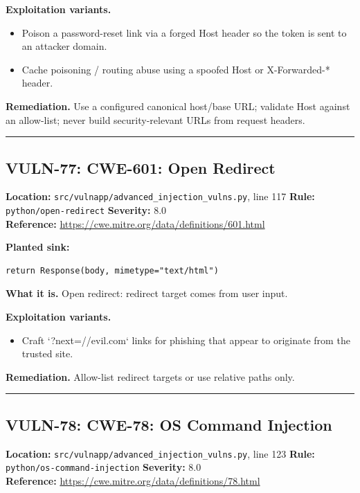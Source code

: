 \documentclass[11pt,a4paper]{article}
\begin{document}
\noindent\textbf{Exploitation variants.}
\begin{itemize}[leftmargin=1.4em,itemsep=1pt,topsep=2pt]
\item Poison a password-reset link via a forged Host header so the token is sent to an attacker domain.
\item Cache poisoning / routing abuse using a spoofed Host or X-Forwarded-* header.
\end{itemize}
\noindent\textbf{Remediation.} Use a configured canonical host/base URL; validate Host against an allow-list; never build security-relevant URLs from request headers.

\vspace{4pt}\hrule\vspace{6pt}
\subsection{VULN-77: CWE-601: Open Redirect}
\noindent\textbf{Location:} \texttt{src/vulnapp/advanced\_injection\_vulns.py}, line 117 \quad \textbf{Rule:} \texttt{python/open-redirect} \quad \textbf{Severity:} 8.0
\\ \textbf{Reference:} \url{https://cwe.mitre.org/data/definitions/601.html}

\noindent\textbf{Planted sink:}
\begin{lstlisting}
return Response(body, mimetype="text/html")
\end{lstlisting}
\noindent\textbf{What it is.} Open redirect: redirect target comes from user input.

\noindent\textbf{Exploitation variants.}
\begin{itemize}[leftmargin=1.4em,itemsep=1pt,topsep=2pt]
\item Craft `?next=//evil.com` links for phishing that appear to originate from the trusted site.
\end{itemize}
\noindent\textbf{Remediation.} Allow-list redirect targets or use relative paths only.

\vspace{4pt}\hrule\vspace{6pt}
\subsection{VULN-78: CWE-78: OS Command Injection}
\noindent\textbf{Location:} \texttt{src/vulnapp/advanced\_injection\_vulns.py}, line 123 \quad \textbf{Rule:} \texttt{python/os-command-injection} \quad \textbf{Severity:} 8.0
\\ \textbf{Reference:} \url{https://cwe.mitre.org/data/definitions/78.html}
\end{document}
